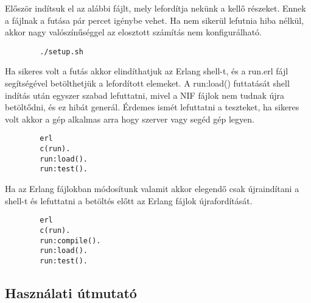 	Először indítsuk el az alábbi fájlt, mely lefordítja nekünk a kellő részeket. Ennek a fájlnak a futása pár percet igénybe vehet. Ha nem sikerül lefutnia hiba nélkül, akkor nagy valószínűséggel az elosztott számítás nem konfigurálható. 
	\begin{verbatim}
		./setup.sh
	\end{verbatim}
	Ha sikeres volt a futás akkor elindíthatjuk az Erlang shell-t, és a run.erl fájl segítségével betölthetjük a lefordított elemeket. A run:load() futtatását shell indítás után egyszer szabad lefuttatni, mivel a NIF fájlok nem tudnak újra betöltődni, és ez hibát generál.\newline
	Érdemes ismét lefuttatni a teszteket, ha sikeres volt akkor a gép alkalmas arra hogy szerver vagy segéd gép legyen.
	\begin{verbatim}
		erl
		c(run).
		run:load().
		run:test().
	\end{verbatim}
	Ha az Erlang fájlokban módosítunk valamit akkor elegendő csak újraindítani a shell-t és lefuttatni a betöltés előtt az Erlang fájlok újrafordítását.
	\begin{verbatim}
		erl
		c(run).
		run:compile().
		run:load().
		run:test().
	\end{verbatim}  
	

\subsection{Használati útmutató}
